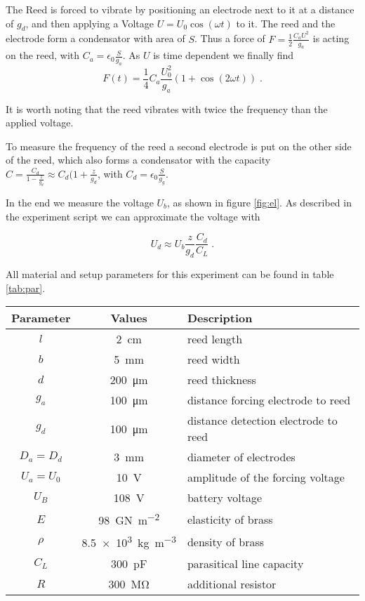 \documentclass[twoside, a4paper, DIV=11,twocolumn, 12pt]{book}
\begin{document}
The Reed is forced to vibrate by positioning an electrode next to it at a distance of $g_d$, and then applying a Voltage $U=U_0\operatorname{cos}(\omega t)$ to it. The reed and the electrode form a condensator with area of $S$. Thus a force of $F = \frac{1}{2} \frac{C_aU^2}{g_a}$ is acting on the reed, with $C_a = \epsilon_0 \frac{S}{g_a}$. As $U$ is time dependent we finally find 
\begin{equation}
 F(t) = \frac{1}{4} C_a \frac{U_0^2}{g_a}(1 + \operatorname{cos}(2\omega t)) \; \text{.}
\end{equation}

It is worth noting that the reed vibrates with twice the frequency than the applied voltage.

To measure the frequency of the reed a second electrode is put on the other side of the reed, which also forms a condensator with the capacity $C = \frac{C_d}{1-\frac{z}{g_d}} \approx C_d(1+\frac{z}{g_d}$, with $C_d = \epsilon_0 \frac{S}{g_g}$.

In the end we measure the voltage $U_b$, as shown in figure \ref{fig:el}. As described in the experiment script \cite{fp75} we can approximate the voltage with 

\begin{equation}
 U_d \approx U_b\frac{z}{g_d}\frac{C_d}{C_L} \; \text{.}
\end{equation}

All material and setup parameters for this experiment can be found in table \ref{tab:par}.
\begin{table*}[ht!]
\centering
 \begin{tabular}{c|c|l}
 Parameter	& Values					& Description \\
 \hline\hline
  $l$		& \SI{2}{\centi\meter}				& reed length \\
  $b$		& \SI{5}{\milli\meter}				& reed width \\
  $d$		& \SI{200}{\micro\meter}			& reed thickness \\
  $g_a$		& \SI{100}{\micro\meter}			& distance forcing electrode to reed \\
  $g_d$		& \SI{100}{\micro\meter}			& distance detection electrode to reed \\
  $D_a = D_d$	& \SI{3}{\milli\meter}				& diameter of electrodes \\
  $U_a = U_0$	& \SI{10}{\volt}				& amplitude of the forcing voltage \\
  $U_B$		& \SI{108}{\volt}				& battery voltage \\
  $E$		& \SI{98}{\giga\newton\per\meter\squared}	& elasticity of brass \\
  $\rho$	& \SI{8.5e3}{\kilo\gram\per\cubic\meter}	& density of brass \\
  $C_L$		& \SI{300}{\pico\farad}				& parasitical line capacity \\
  $R$		& \SI{300}{\mega\ohm}				& additional resistor \\
  \hline\hline
 \end{tabular}
 \caption{Material and setup parameters for the experiment.}
 \label{tab:par}
\end{table*}
\end{document}
